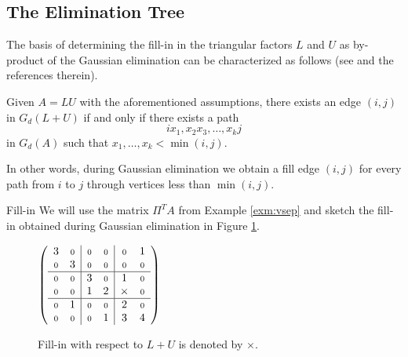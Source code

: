 \subsection{The Elimination Tree}
\label{subsec:etree}
The basis of determining the fill-in in the triangular factors 
$L$ and $U$ as by-product of the Gaussian elimination can be characterized
as follows (see \cite{Gil94} and the references therein). 

\begin{theorem}\label{thr:gilbert}
Given $A=LU$ with the aforementioned assumptions, 
there exists an edge $(i,j)$ in $G_d(L+U)$ if and only if there exists a path
\[
ix_1, x_2x_3, \dots, x_kj
\]
in $G_d(A)$ such that $x_1,\dots,x_k<\min(i,j)$.
\end{theorem}
In other words, during Gaussian elimination we obtain a fill edge $(i,j)$ for
every path from $i$ to $j$ through vertices less than $\min(i,j)$.

\begin{example}{Fill-in}\label{exm:fill}
We will use the matrix $\Pi^TA$ from Example \ref{exm:vsep}  and sketch
the fill-in obtained during Gaussian elimination   in Figure \ref{fig:fill}.
\end{example}
\begin{figure}
\begin{minipage}{.45\textwidth}
    $\left(
        \begin{array}{cc|cc|cc}
        3   & \scriptstyle{0} & \scriptstyle{0} & \scriptstyle{0} & \scriptstyle{0}   &  1  \\
        \scriptstyle{0} & 3   &  \scriptstyle{0}& \scriptstyle{0} & \scriptstyle{0} & \scriptstyle{0}   \\ \hline
        \scriptstyle{0} &  \scriptstyle{0}& 3   & \scriptstyle{0} &  1 & \scriptstyle{0} \\
        \scriptstyle{0} & \scriptstyle{0} &  1 &  2  & \times   & \scriptstyle{0} \\ \hline
        \scriptstyle{0}  & 1  & \scriptstyle{0} & \scriptstyle{0} & 2   & \scriptstyle{0}   \\
        \scriptstyle{0}   & \scriptstyle{0} & \scriptstyle{0} & 1   & 3 & 4   
        \end{array}
    \right)$
\end{minipage}
    \caption{Fill-in with respect to $L+U$ is denoted by $\times$.}
    \label{fig:fill}
\end{figure}


